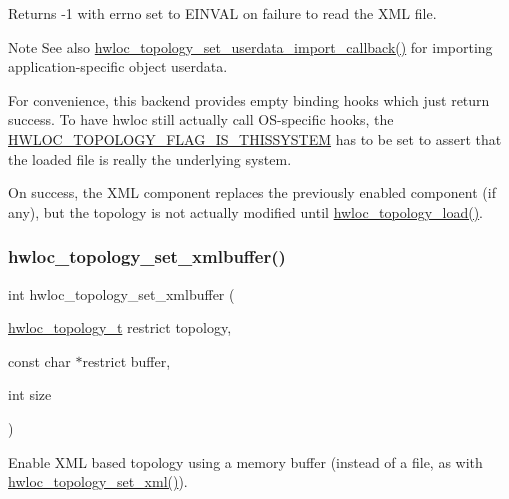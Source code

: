 \begin{DoxyReturn}{Returns}
-\/1 with errno set to E\+I\+N\+V\+AL on failure to read the X\+ML file.
\end{DoxyReturn}
\begin{DoxyNote}{Note}
See also \hyperlink{a00206_ga5ac6917ea7289955fb1ffda4353af9b0}{hwloc\+\_\+topology\+\_\+set\+\_\+userdata\+\_\+import\+\_\+callback()} for importing application-\/specific object userdata.

For convenience, this backend provides empty binding hooks which just return success. To have hwloc still actually call O\+S-\/specific hooks, the \hyperlink{a00193_ggada025d3ec20b4b420f8038d23d6e7bdea6ecb6abc6a0bb75e81564f8bca85783b}{H\+W\+L\+O\+C\+\_\+\+T\+O\+P\+O\+L\+O\+G\+Y\+\_\+\+F\+L\+A\+G\+\_\+\+I\+S\+\_\+\+T\+H\+I\+S\+S\+Y\+S\+T\+EM} has to be set to assert that the loaded file is really the underlying system.

On success, the X\+ML component replaces the previously enabled component (if any), but the topology is not actually modified until \hyperlink{a00186_gabdf58d87ad77f6615fccdfe0535ff826}{hwloc\+\_\+topology\+\_\+load()}. 
\end{DoxyNote}
\mbox{\label{a00192_ga2745616b65595e1c1e579ecc7e461fa8}} 
\subsubsection{\texorpdfstring{hwloc\+\_\+topology\+\_\+set\+\_\+xmlbuffer()}{hwloc\_topology\_set\_xmlbuffer()}}
{\footnotesize\ttfamily int hwloc\+\_\+topology\+\_\+set\+\_\+xmlbuffer (\begin{DoxyParamCaption}\item[{\hyperlink{a00186_ga9d1e76ee15a7dee158b786c30b6a6e38}{hwloc\+\_\+topology\+\_\+t} restrict}]{topology,  }\item[{const char $\ast$restrict}]{buffer,  }\item[{int}]{size }\end{DoxyParamCaption})}



Enable X\+ML based topology using a memory buffer (instead of a file, as with \hyperlink{a00192_ga879439b7ee99407ee911b3ac64e9a25e}{hwloc\+\_\+topology\+\_\+set\+\_\+xml()}). 

